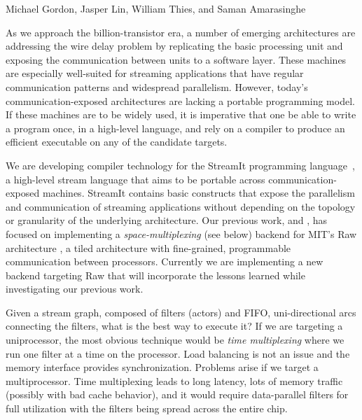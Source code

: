 \documentclass{csailabstractbook}
\begin{document}


         {Michael Gordon, Jasper Lin, William Thies, and Saman Amarasinghe}



As we approach the billion-transistor era, a number of emerging
architectures are addressing the wire delay problem by replicating the
basic processing unit and exposing the communication between units to
a software layer.  These machines are especially well-suited for
streaming applications that have regular communication patterns and
widespread parallelism.  However, today's communication-exposed
architectures are lacking a portable programming model.  If these
machines are to be widely used, it is imperative that one be able to
write a program once, in a high-level language, and rely on a compiler
to produce an efficient executable on any of the candidate targets.

We are developing compiler technology for the StreamIt programming
language~\cite{streamitcc}, a high-level stream language that aims to
be portable across communication-exposed machines.  StreamIt contains
basic constructs that expose the parallelism and communication of
streaming applications without depending on the topology or
granularity of the underlying architecture.  Our previous work,
\cite{streamit-asplos} and \cite{mgordon-thesis}, has focused on 
implementing a {\it space-multiplexing} (see below) backend for
MIT's Raw architecture \cite{raw}, a tiled architecture 
with fine-grained, programmable communication between processors.
Currently we are implementing a new backend targeting Raw that will
incorporate the lessons learned while investigating our previous work.


Given a stream graph, composed of filters (actors) and FIFO,
uni-directional arcs connecting the filters, what is the best way to
execute it?  If we are targeting a uniprocessor, the most obvious
technique would be {\it time multiplexing} where we run one filter at
a time on the processor.  Load balancing is not an issue and the
memory interface provides synchronization.  Problems arise if we
target a multiprocessor.  Time multiplexing leads to long latency,
lots of memory traffic (possibly with bad cache behavior), and it
would require data-parallel filters for full utilization with the
filters being spread across the entire chip.
\end{document}
